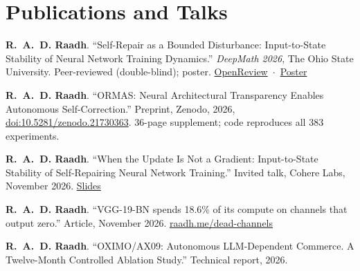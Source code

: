 \documentclass[10pt,a4paper]{article}
\begin{document}
\section*{Publications and Talks}
\begin{pubs}
  \item \textbf{R.~A.~D. Raadh}. ``Self-Repair as a Bounded Disturbance: Input-to-State Stability of Neural Network Training Dynamics.'' \textit{DeepMath 2026}, The Ohio State University. Peer-reviewed (double-blind); poster. \mbox{\href{https://openreview.net/forum?id=kowltBZEIv}{OpenReview} $\cdot$ \href{https://www.raadh.me/deepmath}{Poster}}
  \item \textbf{R.~A.~D. Raadh}. ``ORMAS: Neural Architectural Transparency Enables Autonomous Self-Correction.'' Preprint, Zenodo, 2026, \href{https://doi.org/10.5281/zenodo.21730363}{doi:10.5281/zenodo.21730363}. 36-page supplement; code reproduces all 383 experiments.
  \item \textbf{R.~A.~D. Raadh}. ``When the Update Is Not a Gradient: Input-to-State Stability of Self-Repairing Neural Network Training.'' Invited talk, Cohere Labs, November 2026. \href{https://www.raadh.me/assets/pdf/Raadh_CohereLabs_2026_When_the_Update_Is_Not_a_Gradient.pdf}{Slides}
  \item \textbf{R.~A.~D. Raadh}. ``VGG-19-BN spends 18.6\% of its compute on channels that output zero.'' Article, November 2026. \href{https://www.raadh.me/dead-channels}{raadh.me/dead-channels}
  \item \textbf{R.~A.~D. Raadh}. ``OXIMO/AX09: Autonomous LLM-Dependent Commerce. A Twelve-Month Controlled Ablation Study.'' Technical report, 2026.
\end{pubs}
\end{document}
